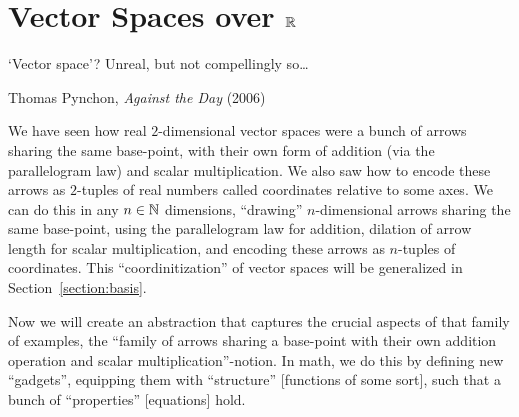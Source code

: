 \section{Vector Spaces over \texorpdfstring{$\mathbb{R}$}{R}}


\epigraph{‘Vector space’? Unreal, but not compellingly so\dots}{Thomas Pynchon, \textit{Against the Day} (2006)}

\M
We have seen how real $2$-dimensional vector spaces were a bunch of
arrows sharing the same base-point, with their own form of addition (via
the parallelogram law) and scalar multiplication. We also saw how to
encode these arrows as $2$-tuples of real numbers called coordinates
relative to some axes. We can do this in any $n\in\mathbb{N}$ dimensions,
``drawing'' $n$-dimensional arrows sharing the same base-point, using
the parallelogram law for addition, dilation of arrow length for scalar
multiplication, and encoding these arrows as $n$-tuples of coordinates.
This ``coordinitization'' of vector spaces will be generalized in Section~\ref{section:basis}.

Now we will create an abstraction that captures the
crucial aspects of that family of examples, the ``family of arrows
sharing a base-point with their own addition operation and scalar
multiplication''-notion. In math, we do this by defining new
``gadgets'', equipping them with ``structure'' [functions of some sort],
such that a bunch of ``properties'' [equations] hold. 

